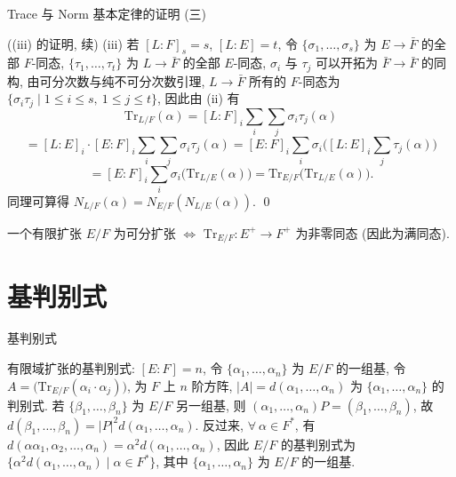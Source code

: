 
\begin{frame}{Trace 与 Norm 基本定律的证明 (三)}

\startproof[bg=yellow, fg=red]((iii) 的证明, 续)
(iii) 若 $[L:F]_s = s$, $[L:E] = t$,
令 $\{ \sigma_1, \dots, \sigma_s \}$ 为 $E \to \bar{F}$ 的全部 $F$-同态,
$\{ \tau_1, \dots, \tau_t \}$ 为 $L \to \bar{F}$ 的全部 $E$-同态,
$\sigma_i$ 与 $\tau_j$ 可以开拓为 $\bar{F} \to \bar{F}$ 的同构,
由可分次数与纯不可分次数引理, $L \to \bar{F}$ 所有的 $F$-同态为
$\{ \sigma_i \tau_j \mid 1 \leq i \leq s,\ 1 \leq j \leq t \}$,
因此由 (ii) 有
\[
\mathrm{Tr}_{L/F}(\alpha) = [L:F]_i \sum_{i} \sum_{j} \sigma_i \tau_j(\alpha)
\]
\[
= [L:E]_i \cdot [E:F]_i \sum_{i} \sum_{j} \sigma_i \tau_j(\alpha)
= [E:F]_i \sum_{i} \sigma_i \Big( [L:E]_i \sum_{j} \tau_j(\alpha) \Big)
\]
\[
= [E:F]_i \sum_{i} \sigma_i \big( \mathrm{Tr}_{L/E}(\alpha) \big)
= \mathrm{Tr}_{E/F}\big( \mathrm{Tr}_{L/E}(\alpha) \big).
\]
同理可算得 $N_{L/F}(\alpha) = N_{E/F}(N_{L/E}(\alpha))$.
\qed

\pause

\begin{cor}[可分扩张的迹判别]
一个有限扩张 $E/F$ 为可分扩张 $\iff$
$\mathrm{Tr}_{E/F}: E^{+} \to F^{+}$ 为非零同态 (因此为满同态).
\end{cor}

\end{frame}


\section[判别式]{基判别式}


\begin{frame}{基判别式}

有限域扩张的基判别式:
$[E:F] = n$, 令 $\{ \alpha_1, \dots, \alpha_n \}$ 为 $E/F$ 的一组基,
令 $A = \big( \mathrm{Tr}_{E/F}(\alpha_i \cdot \alpha_j) \big)$,
为 $F$ 上 $n$ 阶方阵,
$|A| = d(\alpha_1, \dots, \alpha_n)$ 为 $\{ \alpha_1, \dots, \alpha_n \}$
的判别式.
若 $\{ \beta_1, \dots, \beta_n \}$ 为 $E/F$ 另一组基, 则
$(\alpha_1, \dots, \alpha_n)P = (\beta_1, \dots, \beta_n)$,
故 $d(\beta_1, \dots, \beta_n) = |P|^2 d(\alpha_1, \dots, \alpha_n)$.
反过来, $\forall\ \alpha \in F^{*}$, 有
$d(\alpha\alpha_1, \alpha_2, \dots, \alpha_n) = \alpha^2 d(\alpha_1, \dots, \alpha_n)$,
因此 $E/F$ 的基判别式为
$\{ \alpha^2 d(\alpha_1, \dots, \alpha_n) \mid \alpha \in F^{*} \}$,
其中 $\{ \alpha_1, \dots, \alpha_n \}$ 为 $E/F$ 的一组基.

\end{frame}

